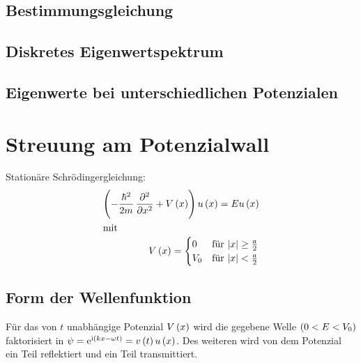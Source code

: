 \subsection{Bestimmungsgleichung}

\subsection{Diskretes Eigenwertspektrum}

\subsection{Eigenwerte bei unterschiedlichen Potenzialen}

\section{Streuung am Potenzialwall}

Stationäre Schrödingergleichung:
\begin{align*}
 \del{-\frac{\hbar^2}{2m} \dpd[2]{}{x} + V\del{x}} u\del{x} = E u\del{x}\\
 \intertext{mit}
 V\del{x} =
 \begin{cases}
  0 & \text{für } \abs{x} \geq \frac{a}{2}\\
  V_0 & \text{für } \abs{x} < \frac{a}{2}
 \end{cases}
\end{align*}


\subsection{Form der Wellenfunktion}
Für das von $t$ unabhängige Potenzial $V\del{x}$ wird die gegebene Welle $\del{0 < E < V_0}$ faktorisiert in $\psi = \ee^{\ii\del{kx-\omega t}} = v\del{t}u\del{x}$.
Des weiteren wird von dem Potenzial ein Teil reflektiert und ein Teil transmittiert.

